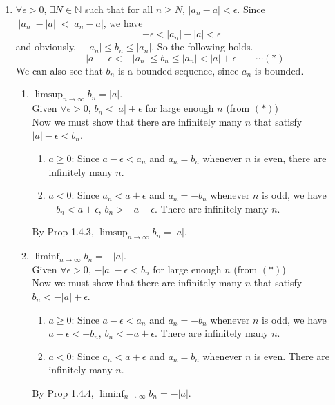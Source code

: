 \documentclass[12pt]{report}
\newcommand{\numl}[1]{\item[\large\textbf{\sffamily #1.}]}
\newcommand{\bb}[1]{\mathbb{#1}}
\newcommand{\abs}[1]{\left|#1\right|}
\newcommand{\ds}{\displaystyle}
\begin{document}
\begin{enumerate}
\numl{5} $\forall\epsilon > 0$, $\exists N\in\bb{N}$ such that for all $n\geq N$, $\abs{a_n-a} < \epsilon$. Since $\abs{\abs{a_n} - \abs{a}} < \abs{a_n-a}$, we have $$-\epsilon < \abs{a_n}-\abs{a} < \epsilon$$and obviously, $-\abs{a_n}\leq b_n\leq \abs{a_n}$. So the following holds.
$$-\abs{a}-\epsilon < -\abs{a_n} \leq b_n\leq \abs{a_n}<\abs{a}+\epsilon \qquad \cdots (*)$$ We can also see that $b_n$ is a bounded sequence, since $a_n$ is bounded.
\begin{enumerate}
	\item $\ds\limsup_{n\rightarrow \infty} b_n = \abs{a}$.\\Given $\forall \epsilon>0$, $b_n<\abs{a}+\epsilon$ for large enough $n$ (from $(*)$)\\Now we must show that there are infinitely many $n$ that satisfy $\abs{a}-\epsilon < b_n$. 
	\begin{enumerate}
		\item $a\geq 0$: Since $a-\epsilon < a_n$ and $a_n=b_n$ whenever $n$ is even, there are infinitely many $n$.
		\item $a < 0$: Since $a_n < a +\epsilon$ and $a_n = -b_n$ whenever $n$ is odd, we have $-b_n < a+\epsilon$, $b_n > -a-\epsilon$. There are infinitely many $n$.
	\end{enumerate}
	By \textsf{Prop 1.4.3}, $\ds \limsup_{n\rightarrow \infty} b_n = \abs{a}$.
	\item $\ds\liminf_{n\rightarrow \infty} b_n = -\abs{a}$.\\Given $\forall \epsilon>0$, $-\abs{a}-\epsilon <b_n$ for large enough $n$ (from $(*)$)\\Now we must show that there are infinitely many $n$ that satisfy $b_n < -\abs{a}+\epsilon $. 
	\begin{enumerate}
		\item $a\geq 0$: Since $a-\epsilon < a_n$ and $a_n=-b_n$ whenever $n$ is odd, we have $a-\epsilon<-b_n$, $b_n < -a+\epsilon$. There are infinitely many $n$.
		\item $a < 0$: Since $a_n < a +\epsilon$ and $a_n = b_n$ whenever $n$ is even. There are infinitely many $n$.
	\end{enumerate}
	By \textsf{Prop 1.4.4}, $\ds \liminf_{n\rightarrow \infty} b_n = -\abs{a}$.
\end{enumerate}


\end{enumerate}
\end{document}
